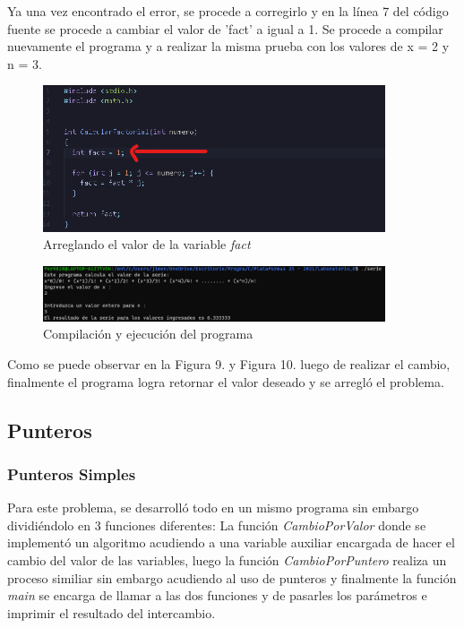 \documentclass[12pt,a4paper]{article}
\begin{document}
Ya una vez encontrado el error, se procede a corregirlo y en la línea 7 del código fuente se procede a cambiar el valor de 'fact' a igual a 1. Se procede a compilar nuevamente el programa y a realizar la misma prueba con los valores de x = 2 y n = 3.

\begin{figure}[H]
    \centering
    \center
    \includegraphics[width=0.9\textwidth]{Fotos_Lab6/Figura9.png}
    \caption{Arreglando el valor de la variable \textit{fact}}
    \label{1}
\end{figure}

\begin{figure}[H]
    \centering
    \center
    \includegraphics[width=0.9\textwidth]{Fotos_Lab6/Figura10.png}
    \caption{Compilación y ejecución del programa}
    \label{1}
\end{figure}

Como se puede observar en la Figura 9. y Figura 10. luego de realizar el cambio, finalmente el programa logra retornar el valor deseado y se arregló el problema.

\subsection{Punteros}

\subsubsection{Punteros Simples}

Para este problema, se desarrolló todo en un mismo programa sin embargo dividiéndolo en 3 funciones diferentes: La función \textit{CambioPorValor} donde se implementó un algoritmo acudiendo a una variable auxiliar encargada de hacer el cambio del valor de las variables, luego la función \textit{CambioPorPuntero} realiza un proceso similiar sin embargo acudiendo al uso de punteros y finalmente la función \textit{main} se encarga de llamar a las dos funciones y de pasarles los parámetros e imprimir el resultado del intercambio.
\end{document}
